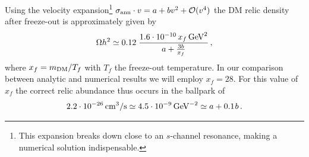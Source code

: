 Using the velocity expansion\footnote{This expansion breaks down close to an $s$-channel resonance, 
making a numerical solution indispensable.}  $\sigma_{\rm ann} \cdot v = a + b v^2 + {\cal O} (v^4)$ the DM relic density  after freeze-out is approximately given by
\begin{equation}
    \Omega h^2 \simeq 0.12 \; \frac{1.6 \cdot 10^{-10} \, x_f \, {\rm GeV}^2}{a + \frac{3b}{x_f}} \,,
\end{equation}
where $x_f = m_{\rm DM}/T_f$ with $T_f$ the freeze-out temperature. In our comparison between analytic and numerical results we will employ $x_f = 28$. For this value of $x_f$ the correct relic abundance thus occurs in the ballpark of
\begin{equation}
2.2 \cdot 10^{-26} \, {\rm cm}^3/{\rm s} \simeq 4.5 \cdot 10^{-9} \, {\rm GeV}^{-2} \simeq a + 0.1 \hspace{0.25mm} b \,.
\end{equation}

